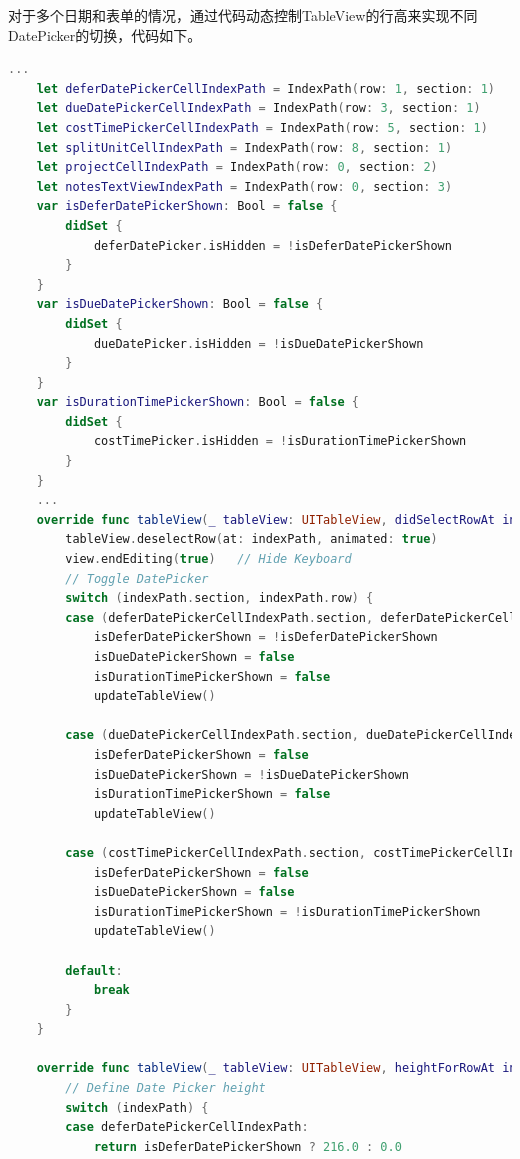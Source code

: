 对于多个日期和表单的情况，通过代码动态控制TableView的行高来实现不同DatePicker的切换，代码如下。

\begin{lstlisting}[language={Swift}, caption={动态调整行高以便输入}]
	...
	let deferDatePickerCellIndexPath = IndexPath(row: 1, section: 1)
    let dueDatePickerCellIndexPath = IndexPath(row: 3, section: 1)
    let costTimePickerCellIndexPath = IndexPath(row: 5, section: 1)
    let splitUnitCellIndexPath = IndexPath(row: 8, section: 1)
    let projectCellIndexPath = IndexPath(row: 0, section: 2)
    let notesTextViewIndexPath = IndexPath(row: 0, section: 3)
    var isDeferDatePickerShown: Bool = false {
        didSet {
            deferDatePicker.isHidden = !isDeferDatePickerShown
        }
    }
    var isDueDatePickerShown: Bool = false {
        didSet {
            dueDatePicker.isHidden = !isDueDatePickerShown
        }
    }
    var isDurationTimePickerShown: Bool = false {
        didSet {
            costTimePicker.isHidden = !isDurationTimePickerShown
        }
    }
	...
	override func tableView(_ tableView: UITableView, didSelectRowAt indexPath: IndexPath) {
        tableView.deselectRow(at: indexPath, animated: true)
        view.endEditing(true)   // Hide Keyboard
        // Toggle DatePicker
        switch (indexPath.section, indexPath.row) {
        case (deferDatePickerCellIndexPath.section, deferDatePickerCellIndexPath.row - 1):
            isDeferDatePickerShown = !isDeferDatePickerShown
            isDueDatePickerShown = false
            isDurationTimePickerShown = false
            updateTableView()
            
        case (dueDatePickerCellIndexPath.section, dueDatePickerCellIndexPath.row - 1):
            isDeferDatePickerShown = false
            isDueDatePickerShown = !isDueDatePickerShown
            isDurationTimePickerShown = false
            updateTableView()
            
        case (costTimePickerCellIndexPath.section, costTimePickerCellIndexPath.row - 1):
            isDeferDatePickerShown = false
            isDueDatePickerShown = false
            isDurationTimePickerShown = !isDurationTimePickerShown
            updateTableView()
        
        default:
            break
        }
	}
	
	override func tableView(_ tableView: UITableView, heightForRowAt indexPath: IndexPath) -> CGFloat {
        // Define Date Picker height
        switch (indexPath) {
        case deferDatePickerCellIndexPath:
            return isDeferDatePickerShown ? 216.0 : 0.0
        

\end{lstlisting}
